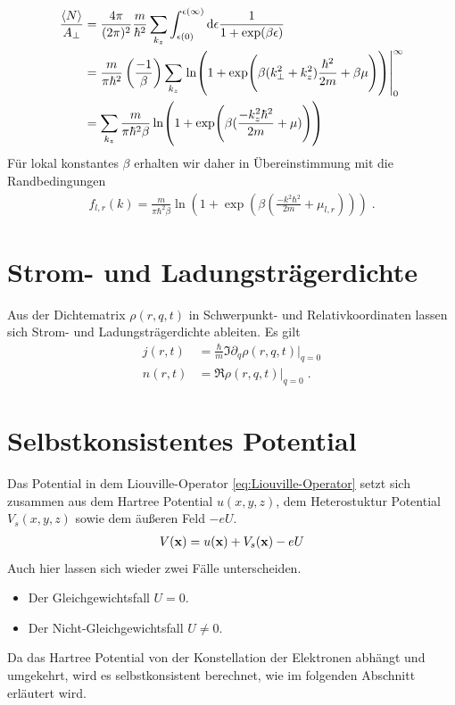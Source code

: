 \begin{align}
  \frac{\expval{N}}{A_{\perp}} &= \frac{4\pi}{(2\pi)^2} \frac{m}{\hbar^2} \sum_{k_z} \int_{\epsilon(0)}^{{\epsilon(\infty)}} \mathop{}\!\mathrm{d} \epsilon \frac{1}{1+\exp(\beta\epsilon)} \\
    &= \frac{m}{\pi\hbar^2}\left( \frac{-1}{\beta}\right) \sum_{k_z} \left.\ln(1+\exp(\beta(k_{\perp}^2 + k_z^2)\frac{\hbar^2}{2m} + \beta\mu))\right|_0^{\infty} \\
    &= \sum_{k_z} \frac{m}{\pi\hbar^2\beta} \ln(1+\exp(\beta(\frac{- k_z^2\hbar^2}{2m} + \mu)))
\end{align}
Für lokal konstantes $\beta$ erhalten wir daher in Übereinstimmung mit \cite{frensley2} die Randbedingungen
\begin{align}
  f_{l,r} (k) = \frac{m}{\pi\hbar^2\beta} \ln(1+\exp(\beta(\frac{- k^2\hbar^2}{2m} + \mu_{l,r}))) \; .
\end{align}


\section{Strom- und Ladungsträgerdichte}
Aus der Dichtematrix $\rho(r,q,t)$ in Schwerpunkt- und Relativkoordinaten lassen sich Strom- und Ladungsträgerdichte ableiten. Es gilt
\begin{align}
  j(r,t) &= \frac{\hbar}{m}\Im{\partial_q \rho(r,q,t)|_{q=0}} \\
  n(r,t) &= \Re{\rho(r,q,t)|_{q=0}} \; .
  \label{eq:dichte}
\end{align}

\section{Selbstkonsistentes Potential}
Das Potential in dem Liouville-Operator \eqref{eq:Liouville-Operator} setzt sich zusammen aus dem Hartree Potential $u(x,y,z)$, dem Heterostuktur Potential $V_s(x,y,z)$ sowie dem äußeren Feld $-eU$.
\begin{align}
  V(\vb{x}) = u(\vb{x}) + V_s(\vb{x}) - eU
\end{align}
Auch hier lassen sich wieder zwei Fälle unterscheiden.
\begin{itemize}
  \item Der Gleichgewichtsfall $U=0$. %
  \item Der Nicht-Gleichgewichtsfall $U\neq 0$. %
\end{itemize}
Da das Hartree Potential von der Konstellation der Elektronen abhängt und umgekehrt, wird es selbstkonsistent berechnet, wie im folgenden Abschnitt erläutert wird.

